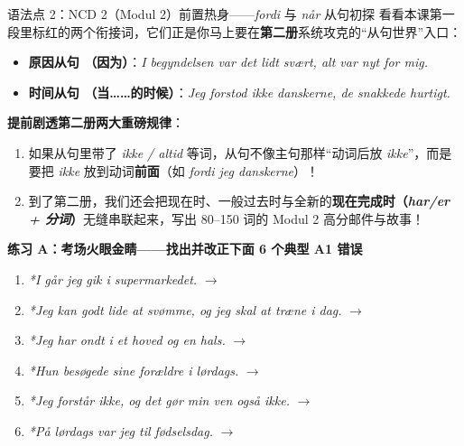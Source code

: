 \begin{grammatikbox}{语法点 2：NCD 2（Modul 2）前置热身——\textit{fordi} 与 \textit{når} 从句初探}
看看本课第一段里标红的两个衔接词，它们正是你马上要在\textbf{第二册}系统攻克的“从句世界”入口：
\begin{itemize}
  \item \textbf{原因从句 （因为）}：\textit{I begyndelsen var det lidt svært,  alt var nyt for mig.}
  \item \textbf{时间从句 （当……的时候）}：\textit{Jeg forstod ikke danskerne,  de snakkede hurtigt.}
\end{itemize}
\textbf{提前剧透第二册两大重磅规律}：
\begin{enumerate}
  \item 如果从句里带了 \textit{ikke / altid} 等词，从句不像主句那样“动词后放 \textit{ikke}”，而是要把 \textit{ikke} 放到动词\textbf{前面}（如 \textit{fordi jeg  danskerne}）！
  \item 到了第二册，我们还会把现在时、一般过去时与全新的\textbf{现在完成时（\textit{har/er + 分词}）}无缝串联起来，写出 80--150 词的 Modul 2 高分邮件与故事！
\end{enumerate}
\end{grammatikbox}


\textbf{练习 A：考场火眼金睛——找出并改正下面 6 个典型 A1 错误}
\begin{enumerate}
  \item \textit{*I går jeg gik i supermarkedet.} $\rightarrow$ \underline{\hspace{6.5cm}}
  \item \textit{*Jeg kan godt lide at svømme, og jeg skal at træne i dag.} $\rightarrow$ \underline{\hspace{6.5cm}}
  \item \textit{*Jeg har ondt i et hoved og en hals.} $\rightarrow$ \underline{\hspace{6.5cm}}
  \item \textit{*Hun besøgede sine forældre i lørdags.} $\rightarrow$ \underline{\hspace{6.5cm}}
  \item \textit{*Jeg forstår ikke, og det gør min ven også ikke.} $\rightarrow$ \underline{\hspace{6.5cm}}
  \item \textit{*På lørdags var jeg til fødselsdag.} $\rightarrow$ \underline{\hspace{6.5cm}}
\end{enumerate}


